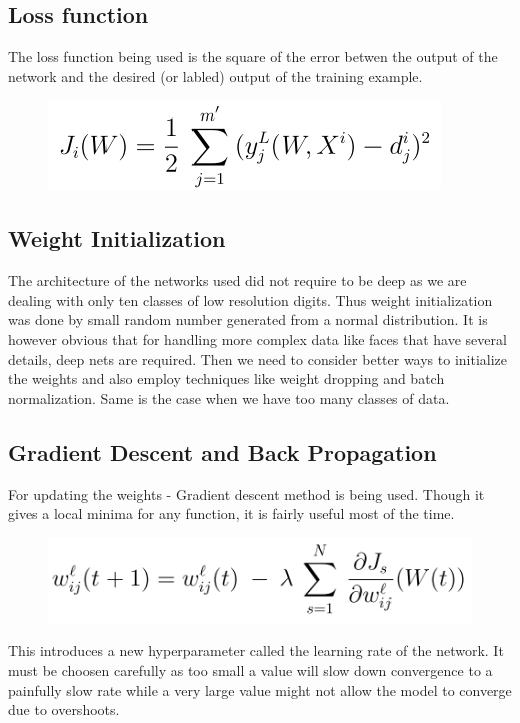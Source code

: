 \documentclass[conference]{IEEEtran}
\begin{document}
\subsection{Loss function}
The loss function being used is the square of the error betwen the output of the network and the desired (or labled) output of the training example.
\begin{figure}[h]
	\centering
	\includegraphics[width=0.65\linewidth]{loss}
\end{figure}

\subsection{Weight Initialization}
The architecture of the networks used did not require to be deep as we are dealing with only ten classes of low resolution digits. Thus weight initialization was done by small random number generated from a normal distribution. It is however obvious that for handling more complex data like faces that have several details, deep nets are required. Then we need to consider better ways to initialize the weights and also employ techniques like weight dropping and batch normalization. Same is the case when we have too many classes of data.

\subsection{Gradient Descent and Back Propagation}
For updating the weights - Gradient descent method is being used. Though it gives a local minima for any function, it is fairly useful most of the time. 
\begin{figure}[h]
	\centering
	\includegraphics[width=0.75\linewidth]{update}
\end{figure}

This introduces a new hyperparameter called the learning rate of the network. It must be choosen carefully as too small a value will slow down convergence to a painfully slow rate while a very large value might not allow the model to converge due to overshoots.
\end{document}
